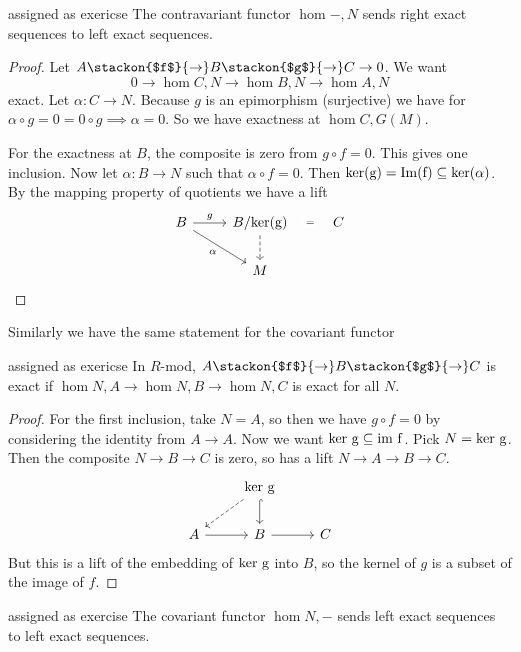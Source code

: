 \begin{aproposition}{assigned as exericse}{}
    The contravariant functor $\hom{-,N}$ sends right exact sequences to left exact sequences.
\end{aproposition}
\begin{proof}
     Let $A\stackon{$f$}{\to} B \stackon{$g$}{\to} C \to 0$. We want \[
     0\to \hom{C,N} \to \hom{B,N}\to \hom{A,N}
     \]
     exact.
    Let $\alpha:C\to N$. Because $g$ is an epimorphism (surjective) we have for $\alpha\circ g=0=0\circ g \implies \alpha=0$. So we have exactness at $\hom{C,G(M)}$.

    For the exactness at $B$, the composite is zero from $g\circ f=0$. This gives one inclusion. Now let $\alpha:B\to N$ such that $\alpha\circ f=0$. Then $\rm{ker}(g)=\rm{Im}(f)\subseteq \rm{ker}(\alpha)$. By the mapping property of quotients we have a lift
\[\begin{tikzcd}
	B & {B/\rm{ker}(g)} & C \\
	& M
	\arrow["g", from=1-1, to=1-2]
	\arrow["\alpha"', from=1-1, to=2-2]
	\arrow["{=}"{description}, draw=none, from=1-2, to=1-3]
	\arrow[dashed,from=1-2, to=2-2]
\end{tikzcd}\]

\end{proof}
Similarly we have the same statement for the covariant functor
\begin{aproposition}{assigned as exericse}{}
      In $R$-mod, $A\stackon{$f$}{\to} B \stackon{$g$}{\to} C$ is exact if $\hom{N,A}\to \hom{N,B} \to \hom{N,C}$ is exact for all $N$.


\end{aproposition}
\begin{proof}
    For the first inclusion, take $N=A$, so then we have $g\circ f =0$ by considering the identity from $A\to A$. Now we want $\rm{ker} \ g \subseteq \rm{im} \ f$. Pick $N=\rm{ker} \ g$. Then the composite $N\to B \to C$ is zero, so has a lift $N\to A\to B \to C$.
    \[\begin{tikzcd}
	& {\rm{ker} \ g} \\
	A & B & C
	\arrow[dashed, from=1-2, to=2-1]
	\arrow[hook, from=1-2, to=2-2]
	\arrow[from=2-1, to=2-2]
	\arrow[from=2-2, to=2-3]
\end{tikzcd}\] But this is a lift of the embedding of $\rm{ker } \ g $ into $B$, so the kernel of $g$ is a subset of the image of $f$.
\end{proof}
\begin{aproposition}{assigned as exercise}  {}
    The covariant functor $\hom{N,-} $ sends left exact sequences to left exact sequences. 
\end{aproposition}
